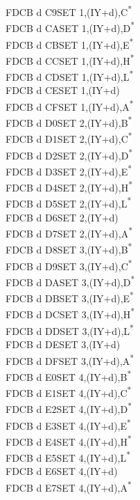 \documentclass[twoside,openright,a4paper]{book}
\begin{document}
\begin{multicols}{3}
{\begin{tabbing}
	FDCB d C9\>SET 1,(IY+d),C\textsuperscript{*}\\
	FDCB d CA\>SET 1,(IY+d),D\textsuperscript{*}\\
	FDCB d CB\>SET 1,(IY+d),E\textsuperscript{*}\\
	FDCB d CC\>SET 1,(IY+d),H\textsuperscript{*}\\
	FDCB d CD\>SET 1,(IY+d),L\textsuperscript{*}\\
	FDCB d CE\>SET 1,(IY+d)\\
	FDCB d CF\>SET 1,(IY+d),A\textsuperscript{*}\\
	FDCB d D0\>SET 2,(IY+d),B\textsuperscript{*}\\
	FDCB d D1\>SET 2,(IY+d),C\textsuperscript{*}\\
	FDCB d D2\>SET 2,(IY+d),D\textsuperscript{*}\\
	FDCB d D3\>SET 2,(IY+d),E\textsuperscript{*}\\
	FDCB d D4\>SET 2,(IY+d),H\textsuperscript{*}\\
	FDCB d D5\>SET 2,(IY+d),L\textsuperscript{*}\\
	FDCB d D6\>SET 2,(IY+d)\\
	FDCB d D7\>SET 2,(IY+d),A\textsuperscript{*}\\
	FDCB d D8\>SET 3,(IY+d),B\textsuperscript{*}\\
	FDCB d D9\>SET 3,(IY+d),C\textsuperscript{*}\\
	FDCB d DA\>SET 3,(IY+d),D\textsuperscript{*}\\
	FDCB d DB\>SET 3,(IY+d),E\textsuperscript{*}\\
	FDCB d DC\>SET 3,(IY+d),H\textsuperscript{*}\\
	FDCB d DD\>SET 3,(IY+d),L\textsuperscript{*}\\
	FDCB d DE\>SET 3,(IY+d)\\
	FDCB d DF\>SET 3,(IY+d),A\textsuperscript{*}\\
	FDCB d E0\>SET 4,(IY+d),B\textsuperscript{*}\\
	FDCB d E1\>SET 4,(IY+d),C\textsuperscript{*}\\
	FDCB d E2\>SET 4,(IY+d),D\textsuperscript{*}\\
	FDCB d E3\>SET 4,(IY+d),E\textsuperscript{*}\\
	FDCB d E4\>SET 4,(IY+d),H\textsuperscript{*}\\
	FDCB d E5\>SET 4,(IY+d),L\textsuperscript{*}\\
	FDCB d E6\>SET 4,(IY+d)\\
	FDCB d E7\>SET 4,(IY+d),A\textsuperscript{*}\\

\end{tabbing}}
\end{multicols}
\end{document}
